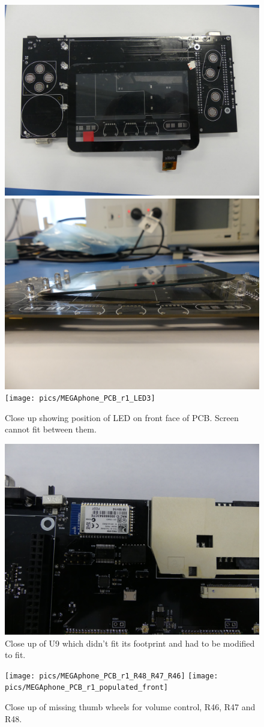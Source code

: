 \begin{figure} \begin{center}
\includegraphics[width=.3\linewidth]{pics/MEGAphone_PCB_r1_LED1}
\includegraphics[width=.3\linewidth]{pics/MEGAphone_PCB_r1_LED2}
\texttt{[image: pics/MEGAphone\_PCB\_r1\_LED3]}
\end{center} 
\caption{Close up showing position of LED on front face of PCB. Screen cannot fit between them. \\}
\label{MEGAphone_PCB_r1_LED}
\end{figure}

\begin{figure} \begin{center}
\includegraphics[width=.3\linewidth]{pics/MEGAphone_PCB_r1_U9}
\end{center} 
\caption{Close up of U9 which didn't fit its footprint and had to be modified to fit. \\}
\label{MEGAphone_PCB_r1_U9}
\end{figure}

\begin{figure} \begin{center}
\texttt{[image: pics/MEGAphone\_PCB\_r1\_R48\_R47\_R46]}
\texttt{[image: pics/MEGAphone\_PCB\_r1\_populated\_front]}
\end{center} 
\caption{Close up of missing thumb wheels for volume control, R46, R47 and R48. \\}
\label{MEGAphone_PCB_r1_R49_R48_R47}
\end{figure}

